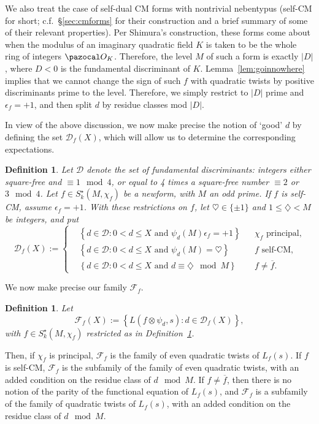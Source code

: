 \documentclass[11pt,reqno]{amsart} \usepackage{fullpage}
\newtheorem{defn}[lemma]{Definition}
\renewcommand{\leq}{\leqslant}
\newcommand{\F}{\ensuremath{\mathbf{F}}}
\newcommand{\ep}{\epsilon}
\newcommand\be{\begin{equation}}
\newcommand\ee{\end{equation}}
\newcommand{\D}{\mathcal D_f}
\renewcommand{\F}{\mathcal F_f}
\numberwithin{equation}{section}
\begin{document}
We also treat the case of self-dual CM forms with nontrivial nebentypus
(self-CM for short; c.f.~\S\ref{sec:cmforms} for their construction and a brief summary of
some of their relevant properties). Per Shimura's construction, these forms come about when
the modulus of an imaginary quadratic field $K$ is taken to be the whole ring of integers
$\pazocal O_K$.
Therefore, the level $M$ of such a form is exactly $|D|$, where $D<0$ is the fundamental
discriminant of $K$. Lemma~\ref{lem:goinnowhere} implies that we cannot change the sign of
such $f$ with quadratic twists by positive discriminants prime to the level. Therefore, we
simply restrict to $|D|$ prime and $\ep_f=+1$, and then split $d$ by residue classes mod
$|D|$.

In view of the above discussion, we now make precise the notion of `good' $d$ by defining
the set $\D(X)$, which will allow us to determine the corresponding expectations.
\begin{defn}\label{def:D}
  Let $\mathcal D$ denote the set of fundamental discriminants: integers either square-free
  and $\equiv1\mod4$, or equal to 4 times a square-free number $\equiv2$ or $3\mod 4$.
  Let $f\in S_k^\star(M,\chi_f)$ be a newform, \emph{with $M$ an odd
    prime. If $f$ is self-CM, assume $\ep_f=+1$.} With these restrictions on $f$, let
  $\heartsuit\in\{\pm1\}$ and $1\leq\diamondsuit<M$ be integers, and put
  \be\label{eq:dgooddef}\D(X):=\left\{\begin{aligned}
      &\left\{d\in\mathcal D:0<d\leq X\text{ and }\psi_d(M)\ep_f=+1\right\}
      &&\text{$\chi_f$ principal,} \\
      &\left\{d\in\mathcal D:0<d\leq X\text{ and }\psi_d(M)=\heartsuit \right\}
      &&\text{$f$ self-CM,} \\
      &\left\{d\in\mathcal D:0<d\leq X\text{ and }d\equiv\diamondsuit\mod M \right\}
      &&\text{$f\ne\overline f$.}\end{aligned}\right.\ee
\end{defn}
We now make precise our family $\F$.
\begin{defn}\label{def:F}
  Let \be\F(X):=\left\{L({f\otimes\psi_d},s):d\in\D(X)\right\},\ee
  with $f\in S^\star_k(M,\chi_f)$ restricted as in Definition~\ref{def:D}.
\end{defn}
Then, if $\chi_f$ is principal, $\F$ is the family of even quadratic twists
of $L_f(s)$. If $f$ is self-CM, $\F$ is the subfamily of the family of even
quadratic twists, with an added condition on the residue class of $d\mod M$.
If $f\ne\overline f$, then there is no notion of the parity of the functional equation
of $L_f(s)$, and $\F$ is a subfamily of the family of quadratic twists of
$L_f(s)$, with an added condition on the residue class of $d\mod M$.
\end{document}
